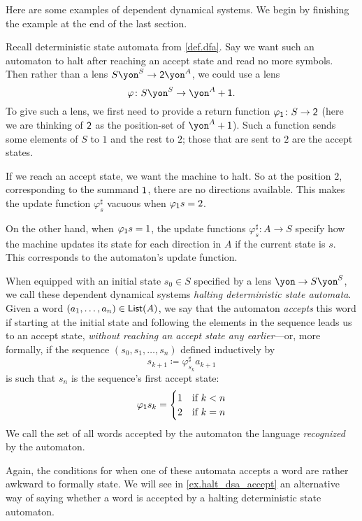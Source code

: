 \documentclass[Book-Poly]{subfiles}
\begin{document}
Here are some examples of dependent dynamical systems.
We begin by finishing the example at the end of the last section.

\begin{example}\label{ex.regular_lang_stop}
Recall deterministic state automata from \cref{def.dfa}.
Say we want such an automaton to halt after reaching an accept state and read no more symbols.
Then rather than a lens $S\yon^S\to \2\yon^A$, we could use a lens
\[
  \varphi\colon S\yon^S\to \yon^A+\1.
\]
To give such a lens, we first need to provide a return function $\varphi_{\textsf{1}}\colon S\to\textsf{2}$ (here we are thinking of $\textsf{2}$ as the position-set of $\yon^A+\1$).
Such a function sends some elements of $S$ to $1$ and the rest to $2$; those that are sent to $2$ are the accept states.

If we reach an accept state, we want the machine to halt.
So at the position $2$, corresponding to the summand $\textsf{1}$, there are no directions available.
This makes the update function $\varphi^\sharp_s$ vacuous when $\varphi_{\textsf{1}}s=2$.

On the other hand, when $\varphi_{\textsf{1}}s=1$, the update functions $\varphi^\sharp_s\colon A\to S$ specify how the machine updates its state for each direction in $A$ if the current state is $s$.
This corresponds to the automaton's update function.

When equipped with an initial state $s_0\in S$ specified by a lens $\yon\to S\yon^S$, we call these dependent dynamical systems \emph{halting deterministic state automata}.
Given a word $(a_1,\ldots,a_n)\in\mathsf{List}(A)$, we say that the automaton \emph{accepts} this word if starting at the initial state and following the elements in the sequence leads us to an accept state, \emph{without reaching an accept state any earlier}---or, more formally, if the sequence $(s_0,s_1,\ldots,s_n)$ defined inductively by
\[
  s_{k+1}\coloneqq \varphi^\sharp_{s_k}a_{k+1}
\]
is such that $s_n$ is the sequence's first accept state:
\[
  \varphi_{\textsf{1}}s_k=\begin{cases}
    1 & \text{if } k<n \\
    2 & \text{if } k=n
  \end{cases}
\]
We call the set of all words accepted by the automaton the language \emph{recognized} by the automaton.
\end{example}

\begin{remark}
Again, the conditions for when one of these automata accepts a word are rather awkward to formally state.
We will see in \cref{ex.halt_dsa_accept} an alternative way of saying whether a word is accepted by a halting deterministic state automaton.
\end{remark}
\end{document}
